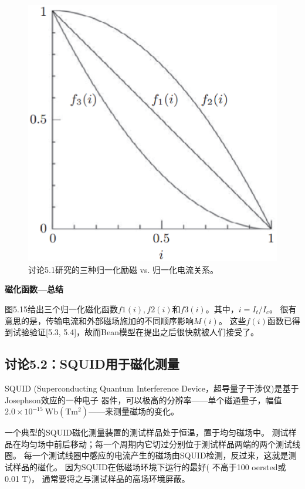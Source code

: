 \begin{figure}[htbp]
	\centering
	\includegraphics[scale=0.5]{chpt5/figs/fig5.15.eps}
	\caption{讨论5.1研究的三种归一化励磁 vs. 归一化电流关系。}
\end{figure}

\textbf{磁化函数---总结}

图5.15给出三个归一化磁化函数$f1(i), f2(i)$和$f3(i)$。其中，$i = I_t/I_c$。
很有意思的是，传输电流和外部磁场施加的不同顺序影响$M(i)$。
这些$f(i)$函数已得到试验验证[5.3, 5.4]，故而Bean模型在提出之后很快就被人们接受了。


\subsection{讨论5.2：SQUID用于磁化测量}
SQUID (Superconducting Quantum Interference Device，超导量子干涉仪)是基于Josephson效应的一种电子
器件，可以极高的分辨率——单个磁通量子，幅值$2.0\times 10^{−15}\ \mathrm{Wb(Tm^2)}$——来测量磁场的变化。

一个典型的SQUID磁化测量装置的测试样品处于恒温，置于均匀磁场中。
测试样品在均匀场中前后移动；每一个周期内它切过分别位于测试样品两端的两个测试线圈。
每一个测试线圈中感应的电流产生的磁场由SQUID检测，反过来，这就是测试样品的磁化。
因为SQUID在低磁场环境下运行的最好( 不高于100 oersted或0.01 T)，
通常要将之与测试样品的高场环境屏蔽。


